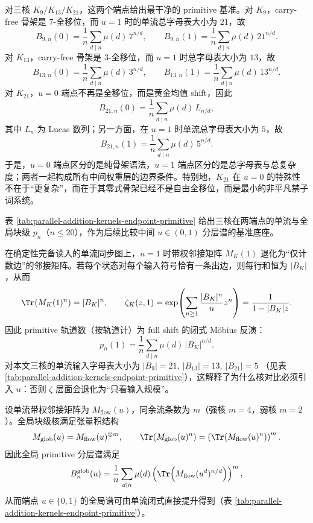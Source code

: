 对三核 \(K_9/K_{13}/K_{21}\)，这两个端点给出最干净的 primitive 基准。对 \(K_9\)，carry-free 骨架是 \(7\)-全移位，而 \(u=1\) 时的单流总字母表大小为 \(21\)，故
\[
B_{9,n}(0)=\frac{1}{n}\sum_{d\mid n}\mu(d)\,7^{n/d},
\qquad
B_{9,n}(1)=\frac{1}{n}\sum_{d\mid n}\mu(d)\,21^{n/d}.
\]
对 \(K_{13}\)，carry-free 骨架是 \(3\)-全移位，而 \(u=1\) 时总字母表大小为 \(13\)，故
\[
B_{13,n}(0)=\frac{1}{n}\sum_{d\mid n}\mu(d)\,3^{n/d},
\qquad
B_{13,n}(1)=\frac{1}{n}\sum_{d\mid n}\mu(d)\,13^{n/d}.
\]
对 \(K_{21}\)，\(u=0\) 端点不再是全移位，而是黄金均值 shift，因此
\[
B_{21,n}(0)=\frac{1}{n}\sum_{d\mid n}\mu(d)\,L_{n/d},
\]
其中 \(L_n\) 为 Lucas 数列；另一方面，在 \(u=1\) 时单流总字母表大小为 \(5\)，故
\[
B_{21,n}(1)=\frac{1}{n}\sum_{d\mid n}\mu(d)\,5^{n/d}.
\]
于是，\(u=0\) 端点区分的是纯骨架语法，\(u=1\) 端点区分的是总字母表与总复杂度；两者一起构成所有中间权重层的边界条件。特别地，\(K_{21}\) 在 \(u=0\) 的特殊性不在于“更复杂”，而在于其零式骨架已经不是自由全移位，而是最小的非平凡禁子词系统。

表 \ref{tab:parallel-addition-kernels-endpoint-primitive} 给出三核在两端点的单流与全局块级 \(p_n\)（\(n\le 20\)），作为后续比较中间 \(u\in(0,1)\) 分层谱的基准底座。


\begin{corollary}[\texorpdfstring{$u=1$}{u=1} 的无权退化：仅看输入规模的 full shift 基线]\label{cor:par-add-u1-degeneracy}
在确定性完备读入的单流同步图上，\(u=1\) 时带权邻接矩阵 \(M_K(1)\) 退化为“仅计数边”的邻接矩阵。若每个状态对每个输入符号恰有一条出边，则每行和恒为 \(|B_K|\)，从而
\[
\Tr(M_K(1)^n)=|B_K|^n,\qquad
\zeta_K(z,1)=\exp\!\left(\sum_{n\ge 1}\frac{|B_K|^n}{n}z^n\right)=\frac{1}{1-|B_K|z}.
\]
因此 primitive 轨道数（按轨道计）为 full shift 的闭式 M\"obius 反演：
\[
p_n(1)=\frac{1}{n}\sum_{d\mid n}\mu(d)\,|B_K|^{n/d}.
\]
对本文三核的单流输入字母表大小为
\(
|B_9|=21,\ |B_{13}|=13,\ |B_{21}|=5
\)
（见表 \ref{tab:parallel-addition-kernels-endpoint-primitive}），这解释了为什么核对比必须引入 \(u\)：否则 \(\zeta\) 层面会退化为“只看输入规模”。
\end{corollary}

\begin{corollary}\label{cor:par-add-global-lift-endpoints}
设单流带权邻接矩阵为 \(M_{\mathrm{flow}}(u)\)，同余流条数为 \(m\)（强核 \(m=4\)，弱核 \(m=2\)）。全局块级核满足张量积结构
\[
M_{\mathrm{glob}}(u)=M_{\mathrm{flow}}(u)^{\otimes m},
\qquad
\Tr(M_{\mathrm{glob}}(u)^n)=\left(\Tr(M_{\mathrm{flow}}(u)^n)\right)^m.
\]
因此全局 primitive 分层谱满足
\[
B^{\mathrm{glob}}_{n}(u)=\frac{1}{n}\sum_{d\mid n}\mu(d)\left(\Tr\!\left(M_{\mathrm{flow}}(u^d)^{n/d}\right)\right)^m,
\]
从而端点 \(u\in\{0,1\}\) 的全局谱可由单流闭式直接提升得到（表 \ref{tab:parallel-addition-kernels-endpoint-primitive}）。
\end{corollary}

